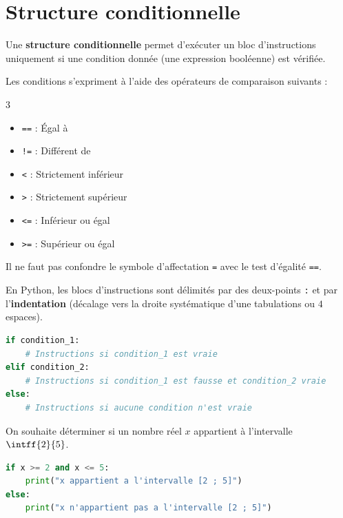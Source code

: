 \section{Structure conditionnelle}

\begin{defin}
	Une \textbf{structure conditionnelle} permet d'exécuter un bloc d'instructions uniquement si une condition donnée (une expression booléenne) est vérifiée.
\end{defin}

\begin{prop}
	Les conditions s'expriment à l'aide des opérateurs de comparaison suivants :
	\begin{multicols}{3}
		\begin{itemize}
			\item \lstinline|==| : Égal à
			\item \lstinline|!=| : Différent de
			\item \lstinline|<| : Strictement inférieur
			\item \lstinline|>| : Strictement supérieur
			\item \lstinline|<=| : Inférieur ou égal
			\item \lstinline|>=| : Supérieur ou égal
		\end{itemize}
	\end{multicols}
\end{prop}

\begin{attention}
	Il ne faut pas confondre le symbole d'affectation \lstinline|=| avec le test d'égalité \lstinline|==|.
\end{attention}

\begin{defin}
	En Python, les blocs d'instructions sont délimités par des deux-points \lstinline|:| et par l'\textbf{indentation} (décalage vers la droite systématique d'une tabulations ou $4$ espaces).

	\begin{lstlisting}[language=Python]
if condition_1:
    # Instructions si condition_1 est vraie
elif condition_2:
    # Instructions si condition_1 est fausse et condition_2 vraie
else:
    # Instructions si aucune condition n'est vraie
\end{lstlisting}
\end{defin}

\begin{methode}
	On souhaite déterminer si un nombre réel $x$ appartient à l'intervalle $\intff{2}{5}$.

	\begin{correction}
		\nline
		\begin{lstlisting}[language=Python]
if x >= 2 and x <= 5:
    print("x appartient a l'intervalle [2 ; 5]")
else:
    print("x n'appartient pas a l'intervalle [2 ; 5]")
\end{lstlisting}
	\end{correction}
\end{methode}

